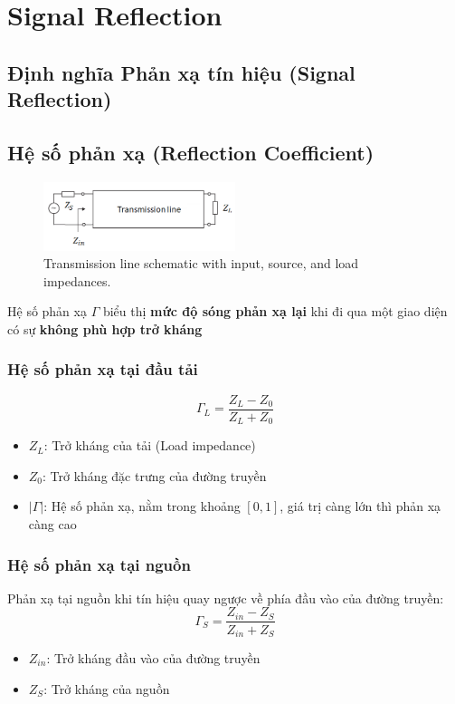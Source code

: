 \chapter{Signal Reflection}
    \section{Định nghĩa Phản xạ tín hiệu (Signal Reflection)}
    \section{Hệ số phản xạ (Reflection Coefficient)}
        \begin{figure}[h]
            \centering
            \includegraphics[width=0.5\textwidth]{figures/transmission_line.png}
            \caption{Transmission line schematic with input, source, and load impedances.}
        \end{figure}
        Hệ số phản xạ $\Gamma$\cite{cadence2023sparams}\cite{cadence2021transmission} biểu thị \textbf{mức độ sóng phản xạ lại} khi đi qua một giao diện có sự \textbf{không phù hợp trở kháng}\par
        
        \subsection{Hệ số phản xạ tại đầu tải}
            $$\Gamma_L = \frac{Z_{L} - Z_0}{Z_{L} + Z_0}$$
            \begin{itemize}
                \item $Z_{L}$: Trở kháng của tải (Load impedance)
                \item $Z_0$: Trở kháng đặc trưng của đường truyền
                \item $|\Gamma|$: Hệ số phản xạ, nằm trong khoảng $\left[0,1\right]$, giá trị càng lớn thì phản xạ càng cao
            \end{itemize}
        
        \subsection{Hệ số phản xạ tại nguồn}
            Phản xạ tại nguồn khi tín hiệu quay ngược về phía đầu vào của đường truyền:
            $$\Gamma_S = \frac{Z_{in} - Z_S}{Z_{in} + Z_S}$$
            \begin{itemize}
                \item $Z_{in}$: Trở kháng đầu vào của đường truyền
                \item $Z_S$: Trở kháng của nguồn
            \end{itemize}
